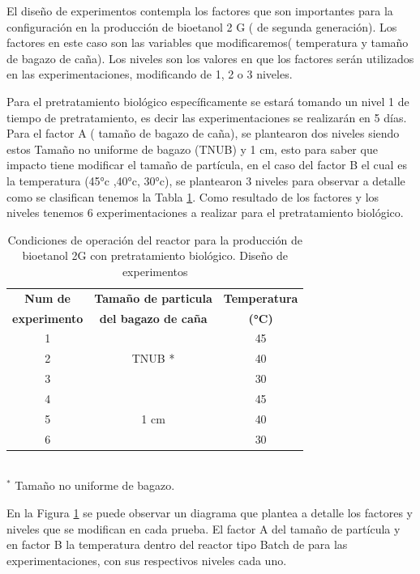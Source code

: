 \documentclass[12pt]{article}
\begin{document}
			
	El diseño de experimentos contempla los factores que son importantes para la configuración en la producción de bioetanol 2 G ( de segunda generación). Los factores en este caso son las variables que modificaremos( temperatura y tamaño de bagazo de caña).	Los niveles son los valores en que los factores serán utilizados en las experimentaciones, modificando de 1, 2 o 3 niveles.
	
	Para el pretratamiento biológico específicamente se estará tomando un nivel 1 de tiempo de pretratamiento, es decir las experimentaciones se realizarán en 5 días. Para el factor A ( tamaño de bagazo de caña), se plantearon dos niveles siendo estos Tamaño no uniforme de bagazo (TNUB) y 1 cm, esto para saber que impacto tiene modificar el tamaño de partícula, en el caso del factor B el cual es la temperatura (45°c ,40°c, 30°c), se plantearon 3 niveles para observar a detalle como se clasifican tenemos la Tabla \ref{biologico2}. Como resultado de los factores y los niveles tenemos 6 experimentaciones a realizar para el pretratamiento biológico.
	

		
	
\begin{table}[H]
	\centering
	\caption{Condiciones de operación del reactor para la producción de bioetanol 2G con pretratamiento biológico. Diseño de experimentos}
	\label{biologico2}
		\begin{tabular}{|c|c|c|  }
			\hline
			\textbf{Num de} & \textbf{Tamaño de particula } & \textbf{Temperatura} \\
		\textbf{experimento} 	& \textbf{ del bagazo de caña} &  \textbf{(°C)}   \\		
			\hline
			1   & \multirow{3}{*}{TNUB *} & 45  \\	\cline{1-1}	
			2 &  & 40 \\ \cline{1-1} 						
			3 &  & 30 \\ \cline{1-3}			
			4 &\multirow{3}{*}{1 cm} & 45    \\\cline{1-1}			
			5 &  & 40   \\  \cline{1-1}				
			6 &  & 30     \\  \cline{1-1}		
			\hline
		\end{tabular}
	\\[3pt] %
	\footnotesize{$^{*}$  Tamaño no uniforme de bagazo.}
	
\end{table}


En la Figura \ref{biologico2} se puede observar un diagrama que plantea a detalle los factores y niveles que se modifican en cada prueba. El factor A del tamaño de partícula y en factor B la temperatura dentro del reactor tipo Batch de para las experimentaciones, con sus respectivos niveles cada uno.
\end{document}

